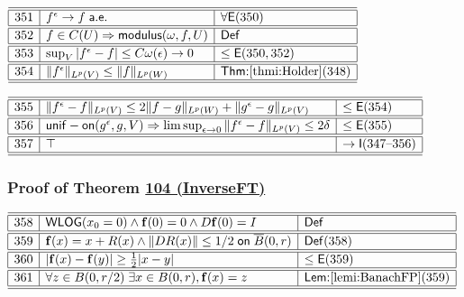 \documentclass[11pt,reqno]{amsart}
\begin{document}
\medskip

\noindent$%
\begin{array}{|r|l|l|}
\hline\hline
351 & f^{\epsilon}\to f\;\mathsf{a.e.} & \forall\mathsf{E}(350) \\ \hline\hline
352 & f\in C(U)\Rightarrow\mathsf{modulus}(\omega,f,U) & \mathsf{Def} \\ \hline\hline
353 & \sup_{V}|f^{\epsilon}-f|\le C\omega(\epsilon)\to0 & \le\mathsf{E}(350,352) \\ \hline\hline
354 & \|f^{\epsilon}\|_{L^{p}(V)}\le\|f\|_{L^{p}(W)} & \textsf{Thm:}\ref{thmi:Holder}(348) \\ \hline\hline
\end{array}%
$

\medskip

\noindent$%
\begin{array}{|r|l|l|}
\hline\hline
355 & \|f^{\epsilon}-f\|_{L^{p}(V)}\le2\|f-g\|_{L^{p}(W)}+\|g^{\epsilon}-g\|_{L^{p}(V)} & \le\mathsf{E}(354) \\ \hline\hline
356 & \mathsf{unif-on}(g^{\epsilon},g,V)\Rightarrow\limsup_{\epsilon\to0}\|f^{\epsilon}-f\|_{L^{p}(V)}\le2\delta & \le\mathsf{E}(355) \\ \hline\hline
357 & \top & \to\mathsf{I}(347\text{--}356) \\ \hline\hline
\end{array}%
$

\medskip

\subsubsection*{Proof of Theorem \hyperlink{thm:InverseFT}{104 (\textsf{InverseFT})}}

\noindent$%
\begin{array}{|r|l|l|}
\hline\hline
358 & \mathsf{WLOG}(x_{0}=0)\wedge\mathbf{f}(0)=0\wedge D\mathbf{f}(0)=I & \mathsf{Def} \\ \hline\hline
359 & \mathbf{f}(x)=x+R(x)\wedge\|DR(x)\|\le1/2\;\mathsf{on}\;\overline{B}(0,r) & \mathsf{Def}(358) \\ \hline\hline
360 & |\mathbf{f}(x)-\mathbf{f}(y)|\ge\tfrac{1}{2}|x-y| & \le\mathsf{E}(359) \\ \hline\hline
361 & \forall z\in B(0,r/2)\;\exists x\in B(0,r),\mathbf{f}(x)=z & \textsf{Lem:}\ref{lemi:BanachFP}(359) \\ \hline\hline
\end{array}%
$

\medskip
\end{document}
